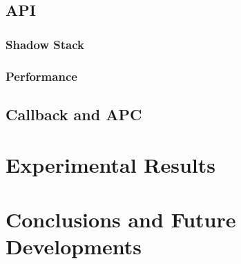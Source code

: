 \documentclass[binding=0.6cm,LaM,english,noexaminfo,oneside]{sapthesis} %
\begin{document}
\section{API}


\subsection{Shadow Stack}
\subsection{Performance}
\section{Callback and APC} 

\chapter{Experimental Results}

\chapter{Conclusions and Future Developments}

\printbibliography 


\end{document}
